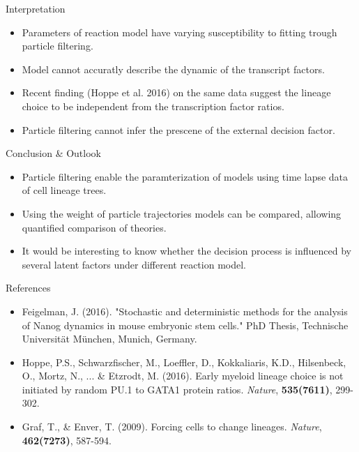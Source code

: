 \documentclass[pdf]
{beamer}
\begin{document}
\begin{frame}{Interpretation}
	\begin{itemize}
		\item Parameters of reaction model have varying susceptibility to fitting trough particle filtering.
		\item Model cannot accuratly describe the dynamic of the transcript factors.
		\item Recent finding (Hoppe et al. 2016) on the same data suggest the lineage choice to be independent from the transcription factor ratios.
		\item Particle filtering cannot infer the prescene of the external decision factor.
	\end{itemize}
\end{frame}

\begin{frame}{Conclusion \& Outlook}
	\begin{itemize}
		\item Particle filtering enable  the paramterization of models using time lapse data of cell lineage trees.
		\item Using the weight of particle trajectories models can be compared, allowing quantified comparison of theories.
		\item It would be interesting to know whether the decision process is influenced by several latent factors under different reaction model.
	\end{itemize}
\end{frame}

\begin{frame}{References}

	\begin{itemize}
		\item Feigelman, J. (2016). "Stochastic and deterministic methods for the analysis of Nanog dynamics in mouse embryonic stem cells." PhD Thesis, Technische Universit\"at M\"unchen, Munich, Germany.
		\item Hoppe, P.S., Schwarzfischer, M., Loeffler, D.,  Kokkaliaris, K.D., Hilsenbeck, O., Mortz, N., ... \& Etzrodt, M. (2016). Early myeloid lineage choice is not initiated by random PU.1 to GATA1 protein ratios. \textit{Nature}, \textbf{535(7611)}, 299-302.
		\item Graf, T., \& Enver, T. (2009). Forcing cells to change lineages. \textit{Nature}, \textbf{462(7273)}, 587-594.
	\end{itemize}
\end{frame}
\end{document}
